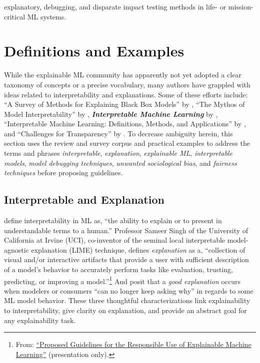 \documentclass{article}
\begin{document}
explanatory, debugging, and disparate impact testing methods in life- or mission-critical ML systems.


\section{Definitions and Examples} \label{sec:intro}

While the explainable ML community has apparently not yet adopted a clear taxonomy of concepts or a precise vocabulary, many authors have grappled with ideas related to interpretability and explanations. Some of these efforts include: ``A Survey of Methods for Explaining Black Box Models''  by \citet{guidotti2018survey}, ``The Mythos of Model Interpretability'' by \citet{lipton1}, \textit{\textbf{Interpretable Machine Learning}} by \citet{molnar}, ``Interpretable Machine Learning: Definitions,
Methods, and Applications'' by \citet{murdoch2019interpretable}, and ``Challenges for Transparency''  by \citet{weller2017challenges}. To decrease ambiguity herein, this section uses the review and survey corpus and practical examples to address the terms and phrases \textit{interpretable}, \textit{explanation}, \textit{explainable ML}, \textit{interpretable models}, \textit{model debugging techniques}, \textit{unwanted sociological bias}, and \textit{fairness techniques} before proposing guidelines.

\subsection{Interpretable and Explanation}

\citet{been_kim1} define interpretability in ML as, ``the ability to explain or to present in understandable terms to a human.'' Professor Sameer Singh of the University of California at Irvine (UCI), co-inventor of the seminal local interpretable model-agnostic explanation (LIME) technique, defines \textit{explanation} as a, ``collection of visual and/or interactive artifacts that provide a user with sufficient description of a model's behavior to accurately perform tasks like evaluation, trusting, predicting, or improving a model.''\footnote{\scriptsize{From: \href{https://github.com/jphall663/kdd_2019}{``Proposed Guidelines for the Responsible Use of Explainable Machine Learning''} (presentation only).}} And \citet{gilpin2018explaining} posit that a \textit{good explanation} occurs when modelers or consumers ``can no longer keep asking why'' in regards to some ML model behavior. These three thoughtful characterizations link explainability to interpretability, give clarity on explanation, and provide an abstract goal for any explainability task.
\end{document}
